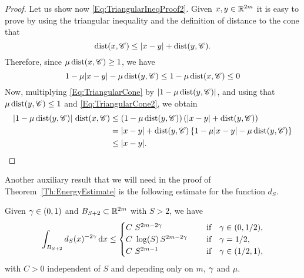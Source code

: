 \begin{proof}
Let us show now \eqref{Eq:TriangularIneqProof2}. Given $x,y \in \mathbb{R}^{2m}$ it is easy to prove by using the triangular inequality and the definition of distance to the cone that
\begin{equation} 
\label{Eq:TriangularCone}
\operatorname{dist}(x,\mathscr{C}) \leq |x-y| + \operatorname{dist}(y,\mathscr{C}).
\end{equation}
Therefore, since $\mu \operatorname{dist}(x,\mathscr{C})\geq 1$, we have
\begin{equation} 
\label{Eq:TriangularCone2}
1-\mu |x-y|- \mu \operatorname{dist}(y,\mathscr{C}) \leq 1-\mu\operatorname{dist}(x,\mathscr{C}) \leq 0
\end{equation}
Now, multiplying \eqref{Eq:TriangularCone} by $|1-\mu\operatorname{dist}(y,\mathscr{C})|$, and using that $\mu \operatorname{dist}(y,\mathscr{C})\leq 1$ and \eqref{Eq:TriangularCone2}, we obtain
\begin{align*}
|1-\mu\operatorname{dist}(y,\mathscr{C})|\,\operatorname{dist}(x,\mathscr{C}) &\leq (1-\mu\operatorname{dist}(y,\mathscr{C})) \left(|x-y| + \operatorname{dist}(y,\mathscr{C})\right) \\
&= |x-y|+\operatorname{dist}(y,\mathscr{C}) \left\{ 1 -\mu |x-y|- \mu \operatorname{dist}(y,\mathscr{C}) \right\} \\
&\leq |x-y|.
\end{align*}
\end{proof}

Another auxiliary result that we will need in the proof of Theorem~\ref{Th:EnergyEstimate} is the following estimate for the function $d_S$. 

\begin{lemma}
\label{Lemma:Integrability_dFunction}
Given $\gamma \in (0,1)$ and $B_{S+2}\subset \mathbb{R}^{2m}$ with $S>2$, we have
$$ \int_{B_{S+2}} d_S(x)^{-2\gamma} \,\mathrm{d} x \leq \begin{cases}
C \ S^{2m-2\gamma}\ \ \ \ &\textrm{if } \ \ \gamma\in(0,1/2),\\
C\ \log(S)\,S^{2m-2\gamma}\ \ \ \ &\textrm{if } \ \ \gamma=1/2,\\
C \ S^{2m-1}\ \ \ \ &\textrm{if } \ \ \gamma\in(1/2,1),\\
\end{cases} $$
with $C>0$ independent of $S$ and depending only on $m$, $\gamma$ and $\mu$.
\end{lemma}


